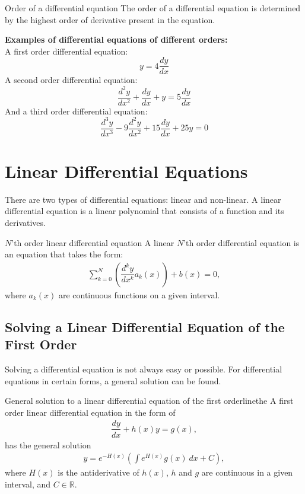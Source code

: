 \clearpage

\begin{definition}{Order of a differential equation}{}
The order of a differential equation is determined by the highest order of derivative present in the equation.
\end{definition} 

\noindent
\textbf{Examples of differential equations of different orders:}
\\
A first order differential equation:
$$y=4\frac{dy}{dx} $$
A second order differential equation:
$$\frac{d^2y}{dx^2}+\frac{dy}{dx}+y = 5\frac{dy}{dx}$$
And a third order differential equation:
$$\frac{d^3y}{dx^3} - 9\frac{d^2y}{dx^2} + 15\frac{dy}{dx} + 25y = 0$$

\section{Linear Differential Equations}
There are two types of differential equations: linear and non-linear. A linear differential equation is a linear polynomial that consists of a function and its derivatives.
\begin{definition}{$N$'th order linear differential equation}{}
A linear $N$'th order differential equation is an equation that takes the form:
\begin{align*}
\sum_{k=0}^{N}\left(\dfrac{d^ky}{dx^k}a_k(x)\right)+b(x)=0,
\end{align*}
where $a_k(x)$ are continuous functions on a given interval.
\end{definition}
\subsection{Solving a Linear Differential Equation of the First Order}
Solving  a differential equation is not always easy or possible. For differential equations in certain forms, a general solution can be found.

\begin{theorem}{General solution to a linear differential equation of the first order}{linethe}
A first order linear differential equation in the form of
\begin{align} \label{FODE_form}
\dfrac{dy}{dx}+h(x)y=g(x),
\end{align}
has the general solution
\begin{align} \label{FODE_solution}
y=e^{-H(x)}\left(\int e^{H(x)}g(x)\ dx+C\right),
\end{align}
where $H(x)$ is the antiderivative of $h(x)$, $h$ and $g$ are continuous in a given interval, and $C\in \mathbb{R}$.
\end{theorem}

